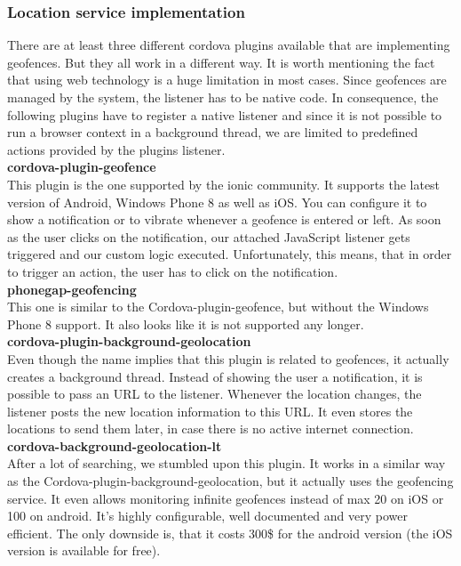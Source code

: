 \documentclass[11pt]{article} %
\begin{document}
\subsubsection{Location service implementation}
There are at least three different cordova plugins available that are implementing geofences. But they all work in a different way. It is worth mentioning the fact that using web technology is a huge limitation in most cases. Since geofences are managed by the system\cite{geofence-android}, the listener has to be native code. In consequence, the following plugins have to register a native listener and since it is not possible to run a browser context in a background thread, we are limited to predefined actions provided by the plugins listener.\\

\textbf{cordova-plugin-geofence}\cite{cordova-plugin-geofence}\\
This plugin is the one supported by the ionic community. It supports the latest version of Android, Windows Phone 8 as well as iOS. You can configure it to show a notification or to vibrate whenever a geofence is entered or left. As soon as the user clicks on the notification, our attached JavaScript listener gets triggered and our custom logic executed. Unfortunately, this means, that in order to trigger an action, the user has to click on the notification.\\

\textbf{phonegap-geofencing}\cite{phonegap-geofencing}\\
This one is similar to the Cordova-plugin-geofence, but without the Windows Phone 8 support. It also looks like it is not supported any longer.\\

\textbf{cordova-plugin-background-geolocation}\cite{cordova-plugin-background-geolocation}\\
Even though the name implies that this plugin is related to geofences, it actually creates a background thread. Instead of showing the user a notification, it is possible to pass an URL to the listener. Whenever the location changes, the listener posts the new location information to this URL. It even stores the locations to send them later, in case there is no active internet connection.\\

\textbf{cordova-background-geolocation-lt}\cite{cordova-background-geolocation-lt}\\
After a lot of searching, we stumbled upon this plugin. It works in a similar way as the Cordova-plugin-background-geolocation, but it actually uses the geofencing service. It even allows monitoring infinite geofences instead of max 20 on iOS or 100 on android. It’s highly configurable, well documented and very power efficient. The only downside is, that it costs 300\$ for the android version (the iOS version is available for free).\\
\end{document}
